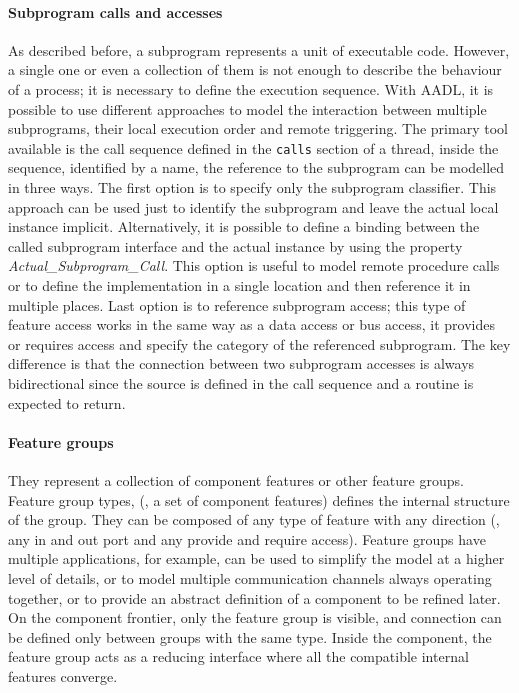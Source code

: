 \paragraph{Subprogram calls and accesses}
As described before, a subprogram represents a unit of executable code. However, a single one or even a collection of them is not enough to describe the behaviour of a process; it is necessary to define the execution sequence. With AADL, it is possible to use different approaches to model the interaction between multiple subprograms, their local execution order and remote triggering. The primary tool available is the call sequence defined in the \texttt{calls} section of a thread, inside the sequence, identified by a name, the reference to the subprogram can be modelled in three ways. The first option is to specify only the subprogram classifier. This approach can be used just to identify the subprogram and leave the actual local instance implicit. Alternatively, it is possible to define a binding between the called subprogram interface and the actual instance by using the property \textit{Actual\_Subprogram\_Call}. This option is useful to model remote procedure calls or to define the implementation in a single location and then reference it in multiple places. Last option is to reference subprogram access; this type of feature access works in the same way as a data access or bus access, it provides or requires access and specify the category of the referenced subprogram. The key difference is that the connection between two subprogram accesses is always bidirectional since the source is defined in the call sequence and a routine is expected to return.

\paragraph{Feature groups}
They represent a collection of component features or other feature groups. Feature group types, (\ie, a set of component features) defines the internal structure of the group. They can be composed of any type of feature with any direction (\ie, any in and out port and any provide and require access). Feature groups have multiple applications, for example, can be used to simplify the model at a higher level of details, or to model multiple communication channels always operating together, or to provide an abstract definition of a component to be refined later. On the component frontier, only the feature group is visible, and connection can be defined only between groups with the same type. Inside the component, the feature group acts as a reducing interface where all the compatible internal features converge.

